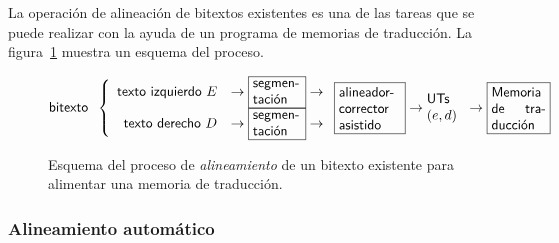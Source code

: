 La operación de alineación de bitextos existentes es una de las tareas que se puede realizar con la ayuda de un programa de memorias de traducción. La figura~\ref{fg:aliMT} muestra un esquema del proceso. \begin{figure} {\small $$ \mbox{\textsf{bitexto}}\;\;\left\{\begin{array}{rcl} \mbox{\textsf{texto izquierdo $E$}} &\to \mbox{\framebox{\parbox{1.25cm}{\textsf{segmen- tación}}}} \to \\ \mbox{\textsf{texto derecho $D$}} &\to \mbox{\framebox{\parbox{1.25cm}{\textsf{segmen- tación}}}} \to \\ \end{array} \right. \mbox{\framebox{\parbox{1.6cm}{\textsf{alineador-corrector asistido}}}} \to \mbox{\parbox{1cm}{\textsf{UTs} $(e,d)$}} \to \mbox{\framebox{\parbox{1.4cm}{\textsf{Memoria de traducción}}}} $$ } \caption{Esquema del proceso de \emph{alineamiento} de un bitexto existente para alimentar una memoria de traducción.} \label{fg:aliMT} \end{figure} 

\subsubsection{Alineamiento automático} 

